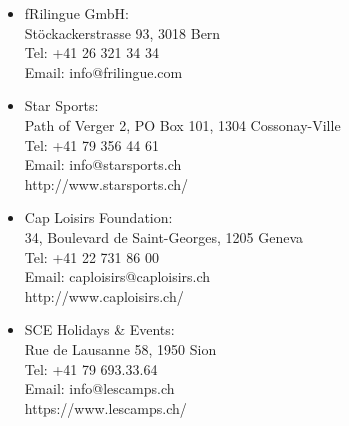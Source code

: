 \begin{itemize}
\vspace{4pt}
\item fRilingue GmbH: \\
Stöckackerstrasse 93, 3018 Bern\\
Tel: +41 26 321 34 34 \\
Email: info@frilingue.com

\vspace{4pt}
\item Star Sports: \\
Path of Verger 2, PO Box 101, 1304 Cossonay-Ville\\
Tel: +41 79 356 44 61\\
Email: info@starsports.ch\\
http://www.starsports.ch/

\vspace{4pt}
\item Cap Loisirs Foundation: \\
34, Boulevard de Saint-Georges, 1205 Geneva\\
Tel: +41 22 731 86 00\\
Email: caploisirs@caploisirs.ch\\
http://www.caploisirs.ch/

\vspace{4pt}
\item SCE Holidays \& Events: \\
Rue de Lausanne 58, 1950 Sion\\
Tel: +41 79 693.33.64\\
Email: info@lescamps.ch\\
https://www.lescamps.ch/\\

\end{itemize}


